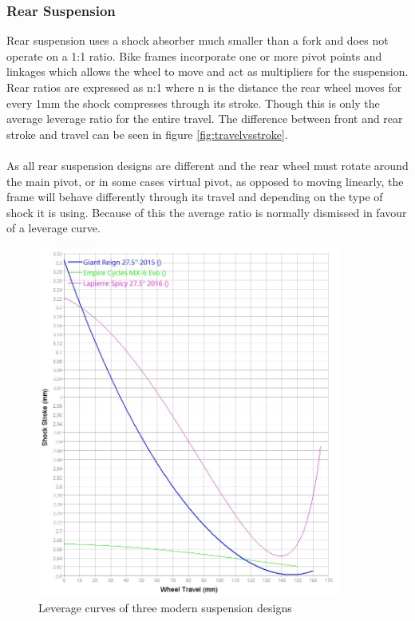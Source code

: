 	\subsubsection{Rear Suspension}
		Rear suspension uses a shock absorber much smaller than a \gls{fork} and does not operate on a 1:1 ratio. Bike frames incorporate one or more pivot points and linkages which allows the wheel to move and act as multipliers for the suspension. Rear ratios are expressed as n:1 where n is the distance the rear wheel moves for every 1mm the shock compresses through its stroke. Though this is only the average leverage ratio for the entire travel. The difference between front and rear stroke and travel can be seen in figure \ref{fig:travelvsstroke}.
		\\\\
		As all rear suspension designs are different and the rear wheel must rotate around the main 
		pivot, or in some cases virtual pivot, as opposed to moving linearly, the frame will behave 
		differently through its travel and depending on the type of \gls{shock} it is using. 
		Because of this the average ratio is normally dismissed in favour of a leverage curve.
		\begin{figure}[h!]
			\centering
			\includegraphics[width=10cm]{../images/3_bike_lev_ratio.jpg}
			\caption{Leverage curves of three modern suspension designs}
			\label{fig:3_bike_lev_ratio}
		\end{figure}
		\\\\
